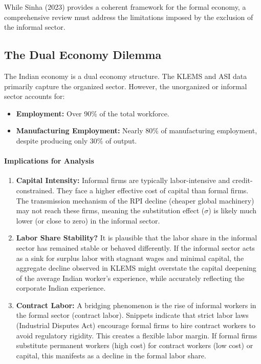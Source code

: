 \documentclass[12pt]{article}
\begin{document}
While Sinha (2023) provides a coherent framework for the formal economy, a comprehensive review must address the limitations imposed by the exclusion of the informal sector.

\subsection{The Dual Economy Dilemma}
The Indian economy is a dual economy structure. The KLEMS and ASI data primarily capture the organized sector. However, the unorganized or informal sector accounts for:
\begin{itemize}[leftmargin=*,itemsep=4pt]
\item \textbf{Employment:} Over 90\% of the total workforce.
\item \textbf{Manufacturing Employment:} Nearly 80\% of manufacturing employment, despite producing only 30\% of output.
\end{itemize}

\paragraph{Implications for Analysis}
\begin{enumerate}[leftmargin=*,itemsep=4pt]
\item \textbf{Capital Intensity:} Informal firms are typically labor-intensive and credit-constrained. They face a higher effective cost of capital than formal firms. The transmission mechanism of the RPI decline (cheaper global machinery) may not reach these firms, meaning the substitution effect ($\sigma$) is likely much lower (or close to zero) in the informal sector.
\item \textbf{Labor Share Stability?} It is plausible that the labor share in the informal sector has remained stable or behaved differently. If the informal sector acts as a sink for surplus labor with stagnant wages and minimal capital, the aggregate decline observed in KLEMS might overstate the capital deepening of the average Indian worker's experience, while accurately reflecting the corporate Indian experience.
\item \textbf{Contract Labor:} A bridging phenomenon is the rise of informal workers in the formal sector (contract labor). Snippets indicate that strict labor laws (Industrial Disputes Act) encourage formal firms to hire contract workers to avoid regulatory rigidity. This creates a flexible labor margin. If formal firms substitute permanent workers (high cost) for contract workers (low cost) or capital, this manifests as a decline in the formal labor share.
\end{enumerate}
\newpage
\end{document}
